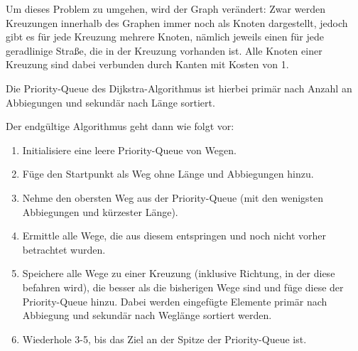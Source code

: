 \documentclass{article}
\theoremstyle{nonumberplain}
\begin{document}
Um dieses Problem zu umgehen, wird der Graph verändert: Zwar werden
Kreuzungen innerhalb des Graphen immer noch als Knoten dargestellt, jedoch gibt es für jede Kreuzung mehrere Knoten, nämlich jeweils einen für jede geradlinige Straße, die in der Kreuzung vorhanden ist.
Alle Knoten einer Kreuzung sind dabei verbunden durch Kanten mit Kosten von 1.

\begin{center}
\end{center}

Die Priority-Queue des Dijkstra-Algorithmus ist hierbei primär nach Anzahl an Abbiegungen und sekundär nach Länge sortiert.

Der endgültige Algorithmus geht dann wie folgt vor:

\begin{enumerate}
    \item Initialisiere eine leere Priority-Queue von Wegen.
    \item Füge den Startpunkt als Weg ohne Länge und Abbiegungen hinzu.
    \item Nehme den obersten Weg aus der Priority-Queue (mit den wenigsten Abbiegungen und kürzester Länge).
    \item Ermittle alle Wege, die aus diesem entspringen und noch nicht vorher betrachtet wurden.
    \item Speichere alle Wege zu einer Kreuzung (inklusive Richtung, in der diese befahren wird), die besser als die bisherigen Wege sind und füge diese der Priority-Queue hinzu. Dabei werden eingefügte Elemente primär nach Abbiegung und sekundär nach Weglänge sortiert werden.
    \item Wiederhole 3-5, bis das Ziel an der Spitze der Priority-Queue ist.
\end{enumerate}
\end{document}
